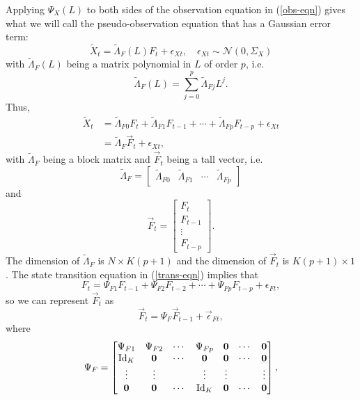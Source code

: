 Applying $\Psi_X (L)$ to both sides of the observation equation in (\ref{obs-eqn}) gives what we will call the pseudo-observation equation that has a Gaussian error term:
\begin{equation}
	\tilde X_{t} = \tilde{\Lambda}_F (L) F_{t} + \epsilon_{X t}, \quad \epsilon_{X t} \sim \mathcal N \left( 0, \Sigma_X \right)
\end{equation}
with $\tilde{\Lambda}_F (L)$ being a matrix polynomial in $L$ of order $p$, i.e.
\begin{equation}
	\tilde{\Lambda}_F (L) = \sum_{j = 0}^{p} \tilde{\Lambda}_{Fj} L^{j}.
\end{equation}
Thus,
\begin{equation}
	\begin{aligned}
		\tilde{X}_{t} &= \tilde{\Lambda}_{F0} F_{t} + \tilde{\Lambda}_{F1} F_{t-1} + \cdots + \tilde{\Lambda}_{Fp} F_{t-p} + \epsilon_{X t} \\
		 &= \tilde{\Lambda}_F \vec{F}_{t} + \epsilon_{Xt},
	\end{aligned}
\end{equation}
with $\tilde{\Lambda}_F$ being a block matrix and $\vec{F}_{t}$ being a tall vector, i.e.
$$\tilde{\Lambda}_F = 
	\begin{bmatrix}
		\tilde{\Lambda}_{F0} & \tilde{\Lambda}_{F1} & \cdots & \tilde{\Lambda}_{Fp} 
	\end{bmatrix}$$
and 
$$ \vec{F}_{t} = 
	\begin{bmatrix}
		F_{t} \\ F_{t-1} \\ \vdots \\ F_{t-p}
	\end{bmatrix}.$$
The dimension of $\tilde{\Lambda}_F$ is $N \times K (p + 1)$ and the dimension of $\vec{F}_{t}$ is $K (p + 1) \times 1$.
The state transition equation in (\ref{trans-eqn}) implies that 
\begin{equation}
	F_{t} = \Psi_{F1} F_{t-1} + \Psi_{F2} F_{t-2} + \cdots + \Psi_{Fp} F_{t - p} + \epsilon_{Ft},
\end{equation}
so we can represent $\vec{F}_{t}$ as 
$$\vec{F}_{t} = \Psi_{F} \vec{F}_{t-1} + \vec{\epsilon}_{Ft},$$
where
$$\Psi_{F} = 
	\begin{bmatrix}
		\Psi_{F1} & \Psi_{F2} & \cdots & \Psi_{Fp} & \bf 0 & \cdots & \bf 0 \\
		\text{Id}_K & \bf 0 & \cdots & \bf 0 & \bf 0 & \cdots & \bf 0 \\
		\vdots & \vdots & & \vdots & \vdots & & \vdots \\
		\bf 0 & \bf 0 & \cdots & \text{Id}_K & \bf 0 & \cdots & \bf 0		
	\end{bmatrix},$$
